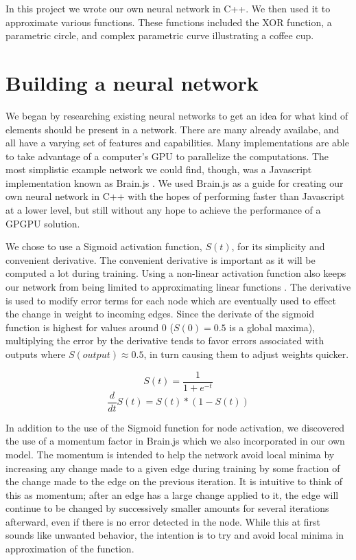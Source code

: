 \documentclass{article}
\begin{document}
\begin{multicols}{2}
In this project we wrote our own neural network in C++. We then used it to approximate various functions. These functions included the XOR function, a parametric circle, and complex parametric curve illustrating a coffee cup.

\section{Building a neural network}

We began by researching existing neural networks to get an idea for what kind of elements should be present in a network. There are many already availabe, and all have a varying set of features and capabilities. Many implementations are able to take advantage of a computer's GPU to parallelize the computations. The most simplistic example network we could find, though, was a Javascript implementation known as Brain.js \cite{brain}. We used Brain.js as a guide for creating our own neural network in C++ with the hopes of performing faster than Javascript at a lower level, but still without any hope to achieve the performance of a GPGPU solution.

We chose to use a Sigmoid activation function, $S(t)$, for its simplicity and convenient derivative. The convenient derivative is important as it will be computed a lot during training. Using a non-linear activation function also keeps our network from being limited to approximating linear functions \cite{hornik}. The derivative is used to modify error terms for each node which are eventually used to effect the change in weight to incoming edges. Since the derivate of the sigmoid function is highest for values around 0 ($S(0) = 0.5$ is a global maxima), multiplying the error by the derivative tends to favor errors associated with outputs where $S(output)\approx0.5$, in turn causing them to adjust weights quicker.

	\[S(t) = \frac{1}{1+e^{-t}}\]
	\[\frac{d}{dt}S(t) = S(t) * (1-S(t))\]

In addition to the use of the Sigmoid function for node activation, we discovered the use of a momentum factor in Brain.js which we also incorporated in our own model. The momentum is intended to help the network avoid local minima by increasing any change made to a given edge during training by some fraction of the change made to the edge on the previous iteration. It is intuitive to think of this as momentum; after an edge has a large change applied to it, the edge will continue to be changed by successively smaller amounts for several iterations afterward, even if there is no error detected in the node. While this at first sounds like unwanted behavior, the intention is to try and avoid local minima in approximation of the function.


\end{multicols}
\end{document}
